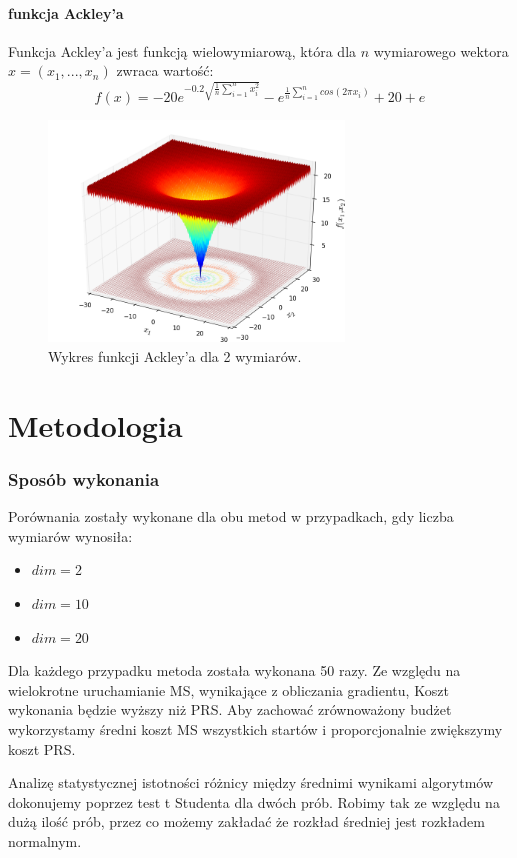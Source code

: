 \documentclass{lab}
\begin{document}
\subsection{funkcja Ackley’a}
Funkcja Ackley'a jest funkcją wielowymiarową, która dla $n$ wymiarowego wektora $x = (x_1, ... , x_n)$ zwraca wartość:
\begin{equation*}
    f(x) = -20e^{-0.2\sqrt{\frac{1}{n}\sum_{i=1}^{n} x^2_i}} - e^{\frac{1}{n}\sum_{i=1}^{n}cos(2\pi x_i)} + 20 + e
\end{equation*}
\begin{figure}[H]
  \centering
  \includegraphics[width=0.7\textwidth]{img/Ackley.png}
  \caption{Wykres funkcji Ackley'a dla 2 wymiarów.}
\end{figure}

\newpage
\part{Metodologia}
\section{Sposób wykonania}
Porównania zostały wykonane dla obu metod w przypadkach, gdy liczba wymiarów wynosiła:
\begin{itemize}
    \item $dim = 2$
    \item $dim = 10$
    \item $dim = 20$
\end{itemize}
\par Dla każdego przypadku metoda została wykonana 50 razy. Ze względu na wielokrotne uruchamianie MS, wynikające z obliczania gradientu, Koszt wykonania będzie wyższy niż PRS. Aby zachować zrównoważony budżet wykorzystamy średni koszt MS wszystkich startów i proporcjonalnie zwiększymy koszt PRS.
\newline\par
Analizę statystycznej istotności różnicy między średnimi wynikami algorytmów dokonujemy poprzez test t Studenta dla dwóch prób. Robimy tak ze względu na dużą ilość prób, przez co możemy zakładać że rozkład średniej jest rozkładem normalnym.
\end{document}
